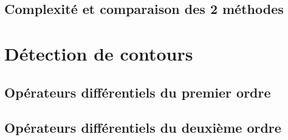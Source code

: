 \documentclass[a4,12pt]{article}
\begin{document}
\subsection{Complexité et comparaison des 2 méthodes}


\section{Détection de contours}

\subsection{Opérateurs différentiels du premier ordre}


\subsection{Opérateurs différentiels du deuxième ordre}
\end{document}
